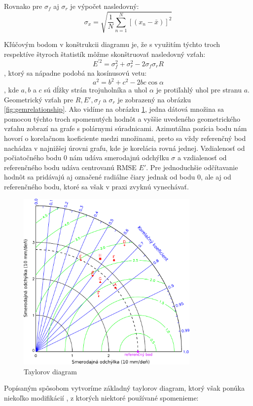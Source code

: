 Rovnako pre $ \sigma_{f} $ aj $ \sigma_{r} $ je výpočet nasledovný:
\[
\sigma_{x} = \sqrt{\frac{1}{N} \sum_{n=1}^{N}[(x_{n} - \bar{x})]^2 }
\]

Kľúčovým bodom v konštrukcii diagramu je, že s využitím týchto troch respektíve štyroch štatistík môžme skonštruovať nasledovný vzťah:
\[
	E^{\prime2} = \sigma_{f}^{2} + \sigma_{r}^{2} - 2\sigma_{f}\sigma_{r}R
\]
, ktorý sa nápadne podobá na kosínusovú vetu:
\[
	a^{2} = b^{2} + c^{2} - 2bc\cos\alpha 
\]
, kde $ a, b $ a $ c $ sú dĺžky strán trojuholníka a uhol $ \alpha $ je protiľahlý uhol pre stranu $ a $. Geometrický vzťah pre $ R, E', \sigma_{f} $ a $ \sigma_{r} $ je zobrazený na obrázku \ref{fig:gemrelationship}. Ako vidíme na obrázku \ref{fig:taylordiagram}, jedna dátová množina sa pomocou týchto troch spomenutých hodnôt a vyššie uvedeného geometrického vzťahu zobrazí na grafe s polárnymi súradnicami. Azimutálna pozícia bodu nám hovorí o korelačnom koeficiente medzi množinami, preto sa vždy referenčný bod nachádza v najnižšej úrovni grafu, kde je korelácia rovná jednej. Vzdialenosť od počiatočného bodu $ 0 $ nám udáva smerodajnú odchýlku $ \sigma $ a vzdialenosť od referenčného bodu udáva centrovanú RMSE $ E' $. Pre jednoduchšie odčítavanie hodnôt sa pridávajú aj označené radiálne čiary jednak od bodu $ 0 $, ale aj od referenčného bodu, ktoré sa však v praxi zvyknú vynechávať.

\begin{figure}
	\centering
	\includegraphics[width = 3.5in]{taylordiagram}
	\caption{ Taylorov diagram \cite{Taylor} }
	\label{fig:taylordiagram}
\end{figure}

Popísaným spôsobom vytvoríme základný taylorov diagram, ktorý však ponúka niekoľko modifikácií \cite{TaylorPrime}, z ktorých niektoré používané spomenieme:

